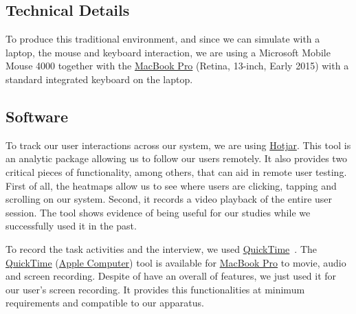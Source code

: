 \subsection{Technical Details}

To produce this traditional environment, and since we can simulate with a laptop, the mouse and keyboard interaction, we are using a Microsoft Mobile Mouse 4000 together with the \hyperlink{https://www.apple.com/shop/buy-mac/macbook-pro}{MacBook Pro} (Retina, 13-inch, Early 2015) with a standard integrated keyboard on the laptop.


\subsection{Software}

To track our user interactions across our system, we are using \hyperlink{https://www.hotjar.com/}{Hotjar}. This tool is an analytic package allowing us to follow our users remotely. It also provides two critical pieces of functionality, among others, that can aid in remote user testing. First of all, the heatmaps allow us to see where users are clicking, tapping and scrolling on our system. Second, it records a video playback of the entire user session. The tool shows evidence of being useful for our studies while we successfully used it in the past.

To record the task activities and the interview, we used \hyperlink{https://support.apple.com/downloads/quicktime}{QuickTime}~\cite{rowell2006internet}. The \hyperlink{https://support.apple.com/downloads/quicktime}{QuickTime} (\hyperlink{https://www.apple.com/}{Apple Computer}) tool is available for \hyperlink{https://www.apple.com/shop/buy-mac/macbook-pro}{MacBook Pro} to movie, audio and screen recording. Despite of have an overall of features, we just used it for our user's screen recording. It provides this functionalities at minimum requirements and compatible to our apparatus.

\clearpage
